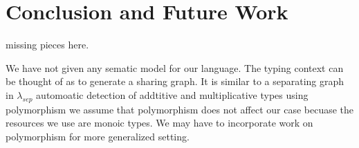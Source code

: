 \chapter{Conclusion and Future Work}

missing pieces here.

We have not given any sematic model for our language. The typing context can be thought
of as to generate a sharing graph. It is similar to a separating graph in $\lambda_{sep}$ \citep{atkey_lambda_sep_2004}
automoatic detection of  addtitive and multiplicative types using polymorphism
we assume that polymorphism does not affect our case becuase the resources we use
are monoic types. We may have to incorporate work on polymorphism \cite{collinson_bunched_2005} for
more generalized setting.